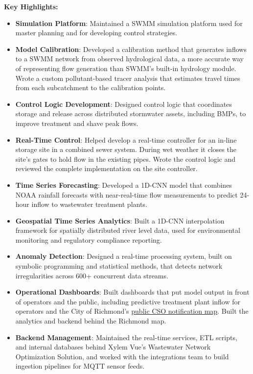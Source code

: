 \documentclass[a4paper,11pt]{article}
\begin{document}
{\small \textbf{Key Highlights:}}
\vspace{-2mm}
\begin{itemize}
	\setlength\itemsep{1mm}
	\item \textbf{Simulation Platform}: Maintained a SWMM simulation platform used for master planning and for developing control strategies.
	\item \textbf{Model Calibration}: Developed a calibration method that generates inflows to a SWMM network from observed hydrological data, a more accurate way of representing flow generation than SWMM's built-in hydrology module. Wrote a custom pollutant-based tracer analysis that estimates travel times from each subcatchment to the calibration points.
	\item \textbf{Control Logic Development}: Designed control logic that coordinates storage and release across distributed stormwater assets, including BMPs, to improve treatment and shave peak flows.
	\item \textbf{Real-Time Control}: Helped develop a real-time controller for an in-line storage site in a combined sewer system. During wet weather it closes the site's gates to hold flow in the existing pipes. Wrote the control logic and reviewed the complete implementation on the site controller.
	\item \textbf{Time Series Forecasting}: Developed a 1D-CNN model that combines NOAA rainfall forecasts with near-real-time flow measurements to predict 24-hour inflow to wastewater treatment plants.
	\item \textbf{Geospatial Time Series Analytics}: Built a 1D-CNN interpolation framework for spatially distributed river level data, used for environmental monitoring and regulatory compliance reporting.
	\item \textbf{Anomaly Detection}: Designed a real-time processing system, built on symbolic programming and statistical methods, that detects network irregularities across 600+ concurrent data streams.
	\item \textbf{Operational Dashboards}: Built dashboards that put model output in front of operators and the public, including predictive treatment plant inflow for operators and the City of Richmond's \href{https://www.rva.gov/public-utilities/csooutfalls}{public CSO notification map}. Built the analytics and backend behind the Richmond map.
	\item \textbf{Backend Management}: Maintained the real-time services, ETL scripts, and internal databases behind Xylem Vue's Wastewater Network Optimization Solution, and worked with the integrations team to build ingestion pipelines for MQTT sensor feeds.
\end{itemize}
\end{document}
